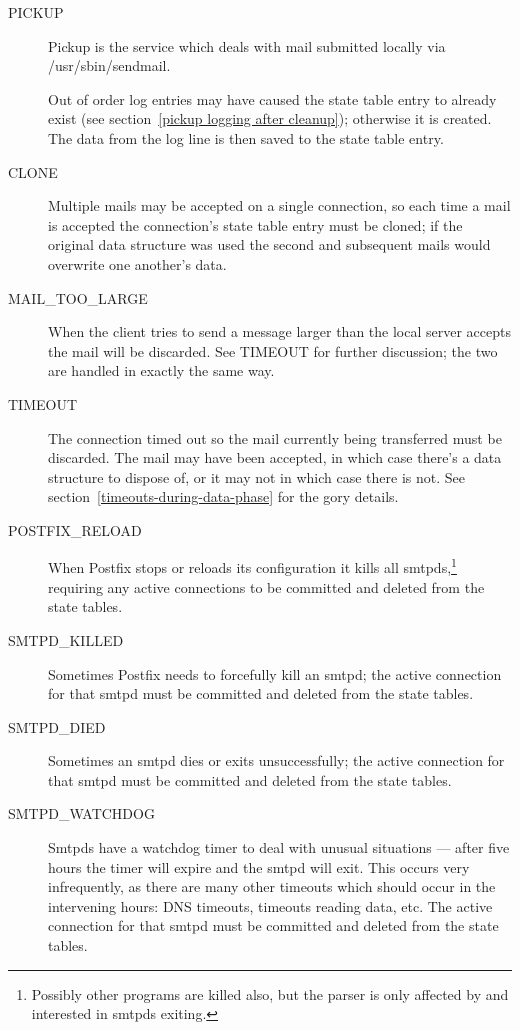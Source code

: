 \documentclass[a4paper,12pt,draft]{article}
\begin{document}
\begin{description}
    \item [PICKUP] Pickup is the service which deals with mail submitted
        locally via /usr/sbin/sendmail. 

        Out of order log entries may have caused the state table entry to
        already exist (see section~\ref{pickup logging after cleanup});
        otherwise it is created.  The data from the log line is then saved
        to the state table entry.

    \item [CLONE] Multiple mails may be accepted on a single connection, so
        each time a mail is accepted the connection's state table entry
        must be cloned; if the original data structure was used the second
        and subsequent mails would overwrite one another's data.

    \item [MAIL\_TOO\_LARGE] When the client tries to send a message larger
        than the local server accepts the mail will be discarded.  See
        TIMEOUT for further discussion; the two are handled in exactly the
        same way.

    \item [TIMEOUT] The connection timed out so the mail currently being
        transferred must be discarded. The mail may have been accepted, in
        which case there's a data structure to dispose of, or it may not in
        which case there is not.  See
        section~\ref{timeouts-during-data-phase} for the gory details.

    \item [POSTFIX\_RELOAD] When Postfix stops or reloads its configuration
        it kills all smtpds,\footnote{Possibly other programs are killed
        also, but the parser is only affected by and interested in smtpds
        exiting.} requiring any active connections to be committed and
        deleted from the state tables.

    \item [SMTPD\_KILLED] Sometimes Postfix needs to forcefully kill an
        smtpd; the active connection for that smtpd must be committed and
        deleted from the state tables.

    \item [SMTPD\_DIED] Sometimes an smtpd dies or exits unsuccessfully;
        the active connection for that smtpd must be committed and deleted
        from the state tables.

    \item [SMTPD\_WATCHDOG] Smtpds have a watchdog timer to deal with
        unusual situations --- after five hours the timer will expire and
        the smtpd will exit.  This occurs very infrequently, as there are
        many other timeouts which should occur in the intervening hours:
        DNS timeouts, timeouts reading data, etc.  The active connection
        for that smtpd must be committed and deleted from the state tables.


\end{description}
\end{document}
